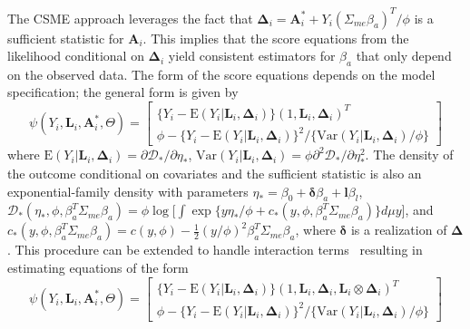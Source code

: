\documentclass[useAMS,usenatbib,referee]{biom}
\begin{document}
The CSME approach leverages the fact that $\bm{\Delta}_{i} = \bm{A}^{*}_{i} + Y_{i}(\Sigma_{me}\beta_{a})^{T}/\phi$ is a sufficient statistic for $\bm{A}_{i}$. This implies that the score equations from the likelihood conditional on $\bm{\Delta}_{i}$ yield consistent estimators for $\beta_{a}$ that only depend on the observed data. The form of the score equations depends on the model specification; the general form is given by
\begin{equation}
    \psi(Y_{i}, \bm{L}_{i}, \bm{A}^{*}_{i}, \Theta) =
    \begin{bmatrix}
       \{ Y_{i} - \text{E}(Y_{i} | \bm{L}_{i}, \bm{\Delta}_{i}) \} (1, \bm{L}_{i}, \bm{\Delta}_{i})^{T} \\
        \phi - \{ Y_{i} - \text{E}(Y_{i} | \bm{L}_{i}, \bm{\Delta}_{i}) \}^{2} / \{ \text{Var}(Y_{i} | \bm{L}_{i}, \bm{\Delta}_{i}) / \phi \}
    \end{bmatrix}
\end{equation}
where $\text{E}(Y_{i} | \bm{L}_{i}, \bm{\Delta}_{i}) = \partial \mathcal{D}_{*} / \partial \eta_{*}$, $\text{Var}(Y_{i} | \bm{L}_{i}, \bm{\Delta}_{i}) = \phi \partial^{2} \mathcal{D}_{*} / \partial \eta^{2}_{*}$. The density of the outcome conditional on covariates and the sufficient statistic is also an exponential-family density with parameters $\eta_{*} = \beta_{0} + \bm{\delta}\beta_{a} + \bm{l}\beta_{l}$, $\mathcal{D}_{*}(\eta_{*}, \phi, \beta_{a}^{T}\Sigma_{me}\beta_{a}) = \phi \log \bigg[ \int \exp \{ y\eta_{*}/\phi + c_{*}(y, \phi,  \beta_{a}^{T}\Sigma_{me}\beta_{a}) \} d\mu y \bigg]$, and $c_{*}(y, \phi, \beta_{a}^{T}\Sigma_{me}\beta_{a}) = c(y, \phi) - \frac{1}{2}(y/\phi)^{2}\beta_{a}^{T}\Sigma_{me}\beta_{a}$, where $\bm{\delta}$ is a realization of $\bm{\Delta}$. This procedure can be extended to handle interaction terms~\citep{dagalp2001} resulting in estimating equations of the form
\begin{equation*}
    \psi(Y_{i}, \bm{L}_{i}, \bm{A}^{*}_{i}, \Theta) =
    \begin{bmatrix}
       \{ Y_{i} - \text{E}(Y_{i} | \bm{L}_{i}, \bm{\Delta}_{i}) \} (1, \bm{L}_{i}, \bm{\Delta}_{i}, \bm{L}_{i} \otimes \bm{\Delta}_{i})^{T} \\
        \phi - \{ Y_{i} - \text{E}(Y_{i} | \bm{L}_{i}, \bm{\Delta}_{i}) \}^{2} / \{ \text{Var}(Y_{i} | \bm{L}_{i}, \bm{\Delta}_{i}) / \phi \}
    \end{bmatrix}
\end{equation*}
\end{document}
